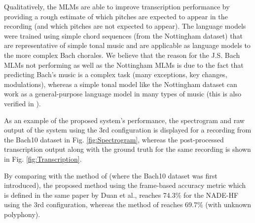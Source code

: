 Qualitatively, the MLMs are able to improve transcription performance by providing a rough estimate of which pitches are expected to appear in the recording (and which pitches are not expected to appear). The language models were trained using simple chord sequences (from the Nottingham dataset) that are representative of simple tonal music and are applicable as language models to the more complex Bach chorales. We believe that the reason for the J.S. Bach MLMs not performing as well as the Nottingham MLMs is due to the fact that predicting Bach's music is a complex task (many exceptions, key changes, modulations), whereas a simple tonal model like the Nottingham dataset can work as a general-purpose language model in many types of music (this is also verified in \cite{Boulanger-Lewandowski2012}).

As an example of the proposed system's performance, the spectrogram and raw output of the system using the 3rd configuration is displayed for a recording from the Bach10 dataset in Fig. \ref{fig:Spectrogram}, whereas the post-processed transcription output along with the ground truth for the same recording is shown in Fig. \ref{fig:Transcription}.

By comparing with the method of \cite{Duan2010} (where the Bach10 dataset was first introduced), the proposed method using the frame-based accuracy metric which is defined in the same paper by Duan et al., reaches 74.3\% for the NADE-HF using the 3rd configuration, whereas the method of \cite{Duan2010} reaches 69.7\% (with unknown polyphony).

\begin{table}[t]
 \begin{center}
\end{center}
\vspace{-0.1in}
 \caption{Transcription results using various system configurations.}
 \label{tab:results}
  \vspace{-0.1in}
\end{table}


